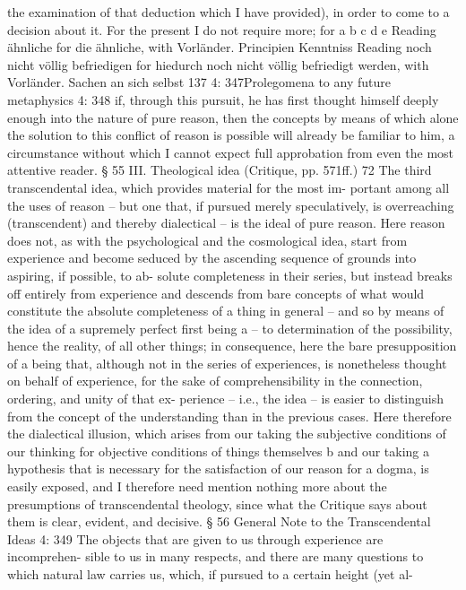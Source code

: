 the examination of that deduction which I have provided), in order to
come to a decision about it. For the present I do not require more; for
a
b
c
d
e
Reading ähnliche for die ähnliche, with Vorländer.
Principien
Kenntniss
Reading noch nicht völlig befriedigen for hiedurch noch nicht völlig befriedigt werden, with
Vorländer.
Sachen an sich selbst
137
4: 347Prolegomena to any future metaphysics
4: 348
if, through this pursuit, he has ﬁrst thought himself deeply enough into
the nature of pure reason, then the concepts by means of which alone
the solution to this conﬂict of reason is possible will already be familiar
to him, a circumstance without which I cannot expect full approbation
from even the most attentive reader.
§ 55
III. Theological idea (Critique, pp. 571ff.) 72
The third transcendental idea, which provides material for the most im-
portant among all the uses of reason – but one that, if pursued merely
speculatively, is overreaching (transcendent) and thereby dialectical – is
the ideal of pure reason. Here reason does not, as with the psychological
and the cosmological idea, start from experience and become seduced
by the ascending sequence of grounds into aspiring, if possible, to ab-
solute completeness in their series, but instead breaks off entirely from
experience and descends from bare concepts of what would constitute
the absolute completeness of a thing in general – and so by means of
the idea of a supremely perfect ﬁrst being a – to determination of the
possibility, hence the reality, of all other things; in consequence, here
the bare presupposition of a being that, although not in the series of
experiences, is nonetheless thought on behalf of experience, for the sake
of comprehensibility in the connection, ordering, and unity of that ex-
perience – i.e., the idea – is easier to distinguish from the concept of the
understanding than in the previous cases. Here therefore the dialectical
illusion, which arises from our taking the subjective conditions of our
thinking for objective conditions of things themselves b and our taking a
hypothesis that is necessary for the satisfaction of our reason for a dogma,
is easily exposed, and I therefore need mention nothing more about the
presumptions of transcendental theology, since what the Critique says
about them is clear, evident, and decisive.
§ 56
General Note
to
the Transcendental Ideas
4: 349
The objects that are given to us through experience are incomprehen-
sible to us in many respects, and there are many questions to which
natural law carries us, which, if pursued to a certain height (yet al-
